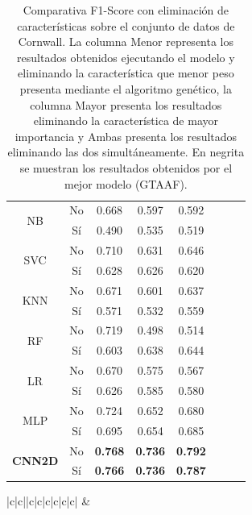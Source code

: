 \documentclass{uathesis-es}
\begin{document}
{\begin{table}[H]
\begin{center}
\begin{tabular}{|c|c||c|c|c|c|c|c|}
					\multirow{2}{*}{NB} &
					No & 0.668 & 0.597 & 0.592\\ &
					Sí  & 0.490 & 0.535 & 0.519 \\ \hline \hline
					\multirow{2}{*}{SVC} &
					No & 0.710 & 0.631 & 0.646\\ &
					Sí  & 0.628 & 0.626 & 0.620 \\ \hline \hline
					\multirow{2}{*}{KNN} &
					No & 0.671 & 0.601 & 0.637\\ &
					Sí  & 0.571 & 0.532 & 0.559 \\ \hline \hline
					\multirow{2}{*}{RF} &
					No & 0.719 & 0.498 & 0.514\\ &
					Sí  & 0.603 & 0.638 & 0.644 \\ \hline \hline
					\multirow{2}{*}{LR} &
					No & 0.670 & 0.575 & 0.567\\ &
					Sí  & 0.626 & 0.585 & 0.580 \\ \hline \hline
					\multirow{2}{*}{MLP} &
					No & 0.724 & 0.652 & 0.680\\ &
					Sí  & 0.695 & 0.654 & 0.685 \\ \hline \hline
					\multirow{2}{*}{\textbf{CNN2D}} &
					No & \textbf{0.768} & \textbf{0.736} & \textbf{0.792}\\ &
					Sí  & \textbf{0.766} & \textbf{0.736} & \textbf{0.787} \\ \hline \hline
				\end{tabular}
			\end{center}
			\caption{Comparativa F1-Score con eliminación de características sobre el conjunto de datos de Cornwall. La columna Menor representa los resultados obtenidos ejecutando el modelo y eliminando la característica que menor peso presenta mediante el algoritmo genético, la columna Mayor presenta los resultados eliminando la característica de mayor importancia y Ambas presenta los resultados eliminando las dos simultáneamente. En negrita se muestran los resultados obtenidos por el mejor modelo (GTAAF).}
			\label{CornwallLoss}
		\end{table}
		
		
		\begin{table}[H]
			\begin{center}
				\begin{tabular}{|c|c||c|c|c|c|c|c|}
					\hline
					 &
					 \\ \hline
					

\end{tabular}
\end{center}
\end{table}}
\end{document}
